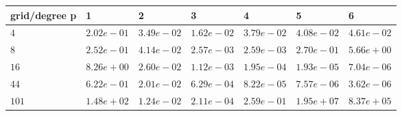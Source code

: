 \begin{tabular}{lllllll}
\hline
 grid/degree p   & 1          & 2          & 3          & 4          & 5          & 6          \\
\hline
 $4$             & $2.02e-01$ & $3.49e-02$ & $1.62e-02$ & $3.79e-02$ & $4.08e-02$ & $4.61e-02$ \\
 $8$             & $2.52e-01$ & $4.14e-02$ & $2.57e-03$ & $2.59e-03$ & $2.70e-01$ & $5.66e+00$ \\
 $16$            & $8.26e+00$ & $2.60e-02$ & $1.12e-03$ & $1.95e-04$ & $1.93e-05$ & $7.04e-06$ \\
 $44$            & $6.22e-01$ & $2.01e-02$ & $6.29e-04$ & $8.22e-05$ & $7.57e-06$ & $3.62e-06$ \\
 $101$           & $1.48e+02$ & $1.24e-02$ & $2.11e-04$ & $2.59e-01$ & $1.95e+07$ & $8.37e+05$ \\
\hline
\end{tabular}